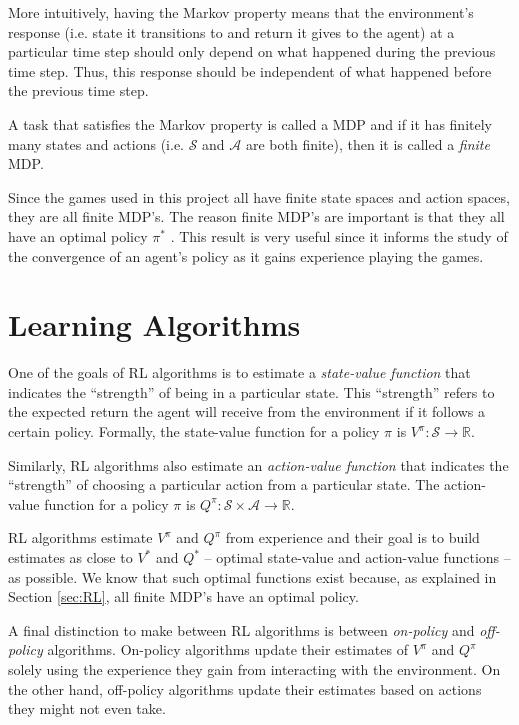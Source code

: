 \documentclass[11pt,a4paper]{report}
\begin{document}
More intuitively, having the Markov property means that the environment's response (i.e. state it transitions to and return it gives to the agent) at a particular time step should only depend on what happened during the previous time step. Thus, this response should be independent of what happened before the previous time step.

A task that satisfies the Markov property is called a MDP and if it has finitely many states and actions (i.e. $\mathcal{S}$ and $\mathcal{A}$ are both finite), then it is called a \emph{finite} MDP. 

Since the games used in this project all have finite state spaces and action spaces, they are all finite MDP's. The reason finite MDP's are important is that they all have an optimal policy $\pi^{\ast}$ \cite{rl-book} \cite{mdp-convergence}. This result is very useful since it informs the study of the convergence of an agent's policy as it gains experience playing the games.


\section{Learning Algorithms}
\label{sec:learning-algorithms}

One of the goals of RL algorithms is to estimate a \emph{state-value function} that indicates the ``strength'' of being in a particular state. This ``strength'' refers to the expected return the agent will receive from the environment if it follows a certain policy. Formally, the state-value function for a policy $\pi$ is $V^{\pi} : \mathcal{S} \rightarrow \mathbb{R}$.

Similarly, RL algorithms also estimate an \emph{action-value function} that indicates the ``strength'' of choosing a particular action from a particular state. The action-value function for a policy $\pi$ is $Q^{\pi} : \mathcal{S} \times \mathcal{A} \rightarrow \mathbb{R}$.

RL algorithms estimate $V^{\pi}$ and $Q^{\pi}$ from experience and their goal is to build estimates as close to $V^{\ast}$ and $Q^{\ast}$ -- optimal state-value and action-value functions -- as possible. We know that such optimal functions exist because, as explained in Section \ref{sec:RL}, all finite MDP's have an optimal policy.

A final distinction to make between RL algorithms is between \emph{on-policy} and \emph{off-policy} algorithms. On-policy algorithms update their estimates of  $V^{\pi}$ and  $Q^{\pi}$ solely using the experience they gain from interacting with the environment. On the other hand, off-policy algorithms update their estimates based on actions they might not even take.
\end{document}
